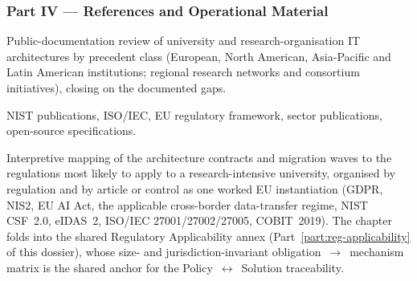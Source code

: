 \documentclass[11pt,a4paper,twoside]{book}
\begin{document}
\subsubsection*{Part IV --- References and Operational Material}

\begin{description}[leftmargin=4em,style=nextline,nosep,font=\bfseries]
  \item[Ch.~31\ \ Institutional precedents]
    Public-documentation review of university and
    research-organisation IT architectures by precedent class
    (European, North American, Asia-Pacific and Latin American
    institutions; regional research networks and consortium
    initiatives), closing on the documented gaps.
  \item[Ch.~32\ \ External references and standards]
    NIST publications, ISO/IEC, EU regulatory framework, sector
    publications, open-source specifications.
  \item[Ch.~33\ \ Regulatory mapping]
    Interpretive mapping of the architecture contracts and migration
    waves to the regulations most likely to apply to a
    research-intensive university, organised by regulation and by
    article or control as one worked EU instantiation (GDPR, NIS2, EU
    AI Act, the applicable cross-border data-transfer regime, NIST
    CSF~2.0, eIDAS~2, ISO/IEC 27001/27002/27005, COBIT~2019). The
    chapter folds into the shared Regulatory Applicability annex
    (Part~\ref{part:reg-applicability} of this dossier), whose
    size- and jurisdiction-invariant obligation~$\rightarrow$~mechanism
    matrix is the shared anchor for the Policy~$\leftrightarrow$~Solution
    traceability.
\end{description}

\backmatter



\printbibliography

\printabstractappendix
\end{document}
